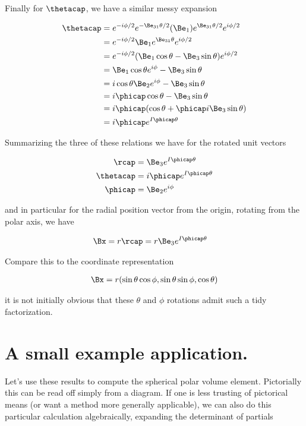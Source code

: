 Finally for $\thetacap$, we have a similar messy expansion

\begin{align*}
\thetacap 
&= e^{-i \phi/2} e^{-\Be_{31}\theta/2} (\Be_1) e^{\Be_{31}\theta/2} e^{i\phi/2} \\
&= e^{-i \phi/2} \Be_1 e^{\Be_{31}\theta} e^{i\phi/2} \\
&= e^{-i \phi/2} (\Be_1 \cos\theta - \Be_3 \sin\theta) e^{i\phi/2} \\
&= \Be_1 \cos\theta e^{i\phi} - \Be_3 \sin\theta \\
&= i \cos\theta \Be_2 e^{i\phi} - \Be_3 \sin\theta \\
&= i \phicap \cos\theta - \Be_3 \sin\theta \\
&= i \phicap (\cos\theta + \phicap i \Be_3 \sin\theta) \\
&= i \phicap e^{I\phicap\theta}
\end{align*}

Summarizing the three of these relations we have for the rotated unit vectors

\begin{align}\label{eqn:sphericalPolarUnit:goo15}
\rcap &= \Be_3 e^{I \phicap \theta} \\
\thetacap &= i \phicap e^{I \phicap \theta} \\
\phicap &= \Be_2 e^{i\phi} 
\end{align}

and in particular for the radial position vector from the origin, rotating from the polar axis, we have

\begin{align}\label{eqn:sphericalPolarUnit:angExp2}
\Bx &= r \rcap = r \Be_3 e^{I\phicap \theta}
\end{align}

Compare this to the coordinate representation

\begin{align}\label{eqn:sphericalPolarUnit:foo3}
\Bx = r(\sin\theta \cos\phi, \sin\theta \sin\phi, \cos\theta)
\end{align}

it is not initially obvious that these $\theta$ and $\phi$ rotations admit such a tidy factorization.

\section{A small example application.}

Let's use these results to compute the spherical polar volume element.  Pictorially this can be read off simply from a diagram.  If one is less trusting of pictorical means (or want a method more generally applicable), we can also do this particular calculation algebraically, expanding the determinant of partials

